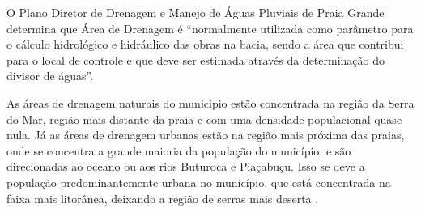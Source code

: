 	O Plano Diretor de Drenagem e Manejo de Águas Pluviais de Praia Grande determina que Área de Drenagem é ``normalmente utilizada como parâmetro para o cálculo hidrológico e hidráulico das obras na bacia, sendo a área que contribui para o local de controle e que deve ser estimada através da determinação do divisor de águas''. \cite[p.142]{fcth2015a}

%


	As áreas de drenagem naturais do município estão concentrada na região da Serra do Mar, região mais distante da praia e com uma densidade populacional quase nula. Já as áreas de drenagem urbanas estão na região mais próxima das praias, onde se concentra a grande maioria da população do município, e são direcionadas ao oceano ou aos rios Buturoca e Piaçabuçu. Isso se deve a população predominantemente urbana no município, que está concentrada na faixa mais litorânea, deixando a região de serras mais deserta \cite[p.191]{Cunha2015a}.
	
